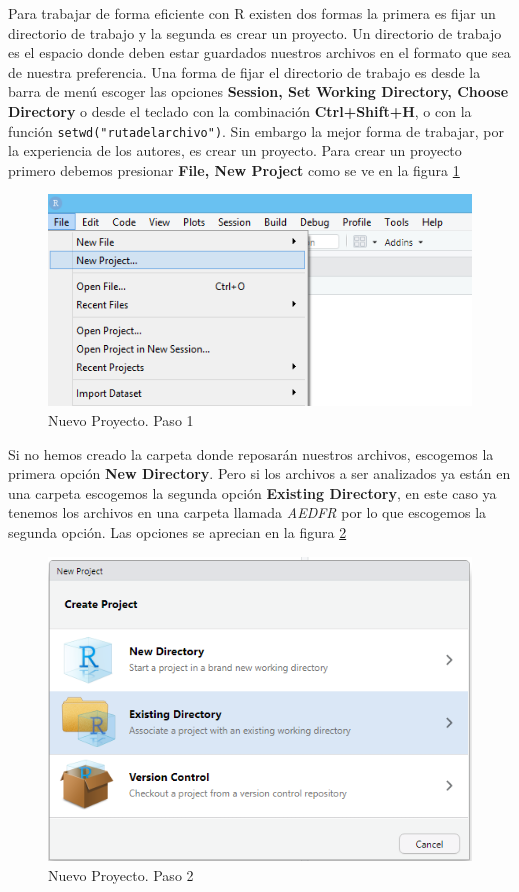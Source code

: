 \documentclass[letterpaper,]{book}
\begin{document}
Para trabajar de forma eficiente con R existen dos formas la primera es fijar un directorio de trabajo y la segunda es crear un proyecto. Un directorio de trabajo es el espacio donde deben estar guardados nuestros archivos en el formato que sea de nuestra preferencia. Una forma de fijar el directorio de trabajo es desde la barra de menú escoger las opciones \textbf{Session, Set Working Directory, Choose Directory} o desde el teclado con la combinación \textbf{Ctrl+Shift+H}, o con la función \texttt{setwd("rutadelarchivo")}.
Sin embargo la mejor forma de trabajar, por la experiencia de los autores, es crear un proyecto. Para crear un proyecto primero debemos presionar \textbf{File, New Project} como se ve en la figura \ref{fig:project1}

\begin{figure}[!h]

{\centering \includegraphics[width=0.45\linewidth]{project1} 

}

\caption{Nuevo Proyecto. Paso 1}\label{fig:project1}
\end{figure}

Si no hemos creado la carpeta donde reposarán nuestros archivos, escogemos la primera opción \textbf{New Directory}. Pero si los archivos a ser analizados ya están en una carpeta escogemos la segunda opción \textbf{Existing Directory}, en este caso ya tenemos los archivos en una carpeta llamada \emph{AEDFR} por lo que escogemos la segunda opción. Las opciones se aprecian en la figura \ref{fig:project2}

\begin{figure}[!h]

{\centering \includegraphics[width=0.45\linewidth]{project2} 

}

\caption{Nuevo Proyecto. Paso 2}\label{fig:project2}
\end{figure}
\end{document}
